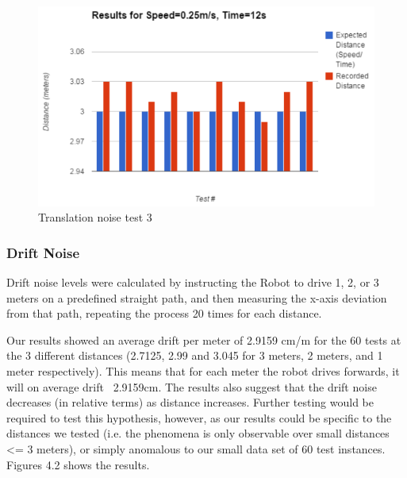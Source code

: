 \documentclass{article}
\begin{document}
	\begin{figure}[H]
	\begin{center}
	\includegraphics[width=0.9\linewidth]{ExperimentalResults3}
	\caption{Translation noise test 3}
	\end{center}
	\end{figure}
	
	\subsubsection{Drift Noise}
	Drift noise levels were calculated by instructing the Robot to drive 1, 2, or 3 meters on a predefined straight path, and then measuring the x-axis deviation from that path, repeating the process 20 times for each distance.

Our results showed an average drift per meter of 2.9159 cm/m for the 60 tests at the 3 different distances (2.7125, 2.99 and 3.045 for 3 meters, 2 meters, and 1 meter respectively). This means that for each meter the robot drives forwards, it will on average drift ~2.9159cm. The results also suggest that the drift noise decreases (in relative terms) as distance increases. Further testing would be required to test this hypothesis, however, as our results could be specific to the distances we tested (i.e. the phenomena is only observable over small distances <= 3 meters), or simply anomalous to our small data set of 60 test instances. Figures 4.2 shows the results.
	
\end{document}
